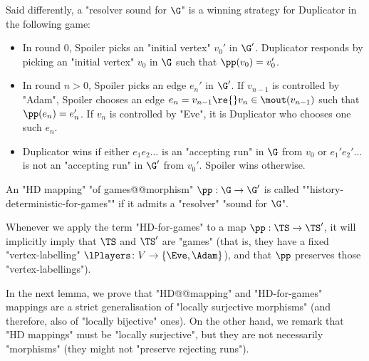 \documentclass{theoretics}
\begin{document}
Said differently, a "resolver sound for $\G$" is a winning strategy for Duplicator in the following game:
\begin{itemize}
	\item In round $0$, Spoiler picks an "initial vertex" $v_0'$ in $\G'$. Duplicator responds by picking an "initial vertex" $v_0$ in $\G$ such that $\pp(v_0) = v_0'$.
	\item In round $n>0$, Spoiler picks an edge $e_n'$ in $\G'$. If $v_{n-1}$ is controlled by "Adam", Spoiler chooses an edge $e_n = v_{n-1}\re{} v_{n}\in \mout(v_{n-1})$ such that $\pp(e_n) = e_n'$. If $v_n$ is controlled by "Eve", it is Duplicator who chooses one such $e_n$. 
	\item Duplicator wins if either $e_1e_2\dots$ is an "accepting run" in $\G $ from $v_0$ or $e_1'e_2'\dots$ is not an "accepting run" in $\G'$ from $v_0'$. Spoiler wins otherwise.
\end{itemize}

\begin{definition}\label{def:HD mapping-for-games}
	An "HD mapping" "of games@@morphism" $\pp:\G \to \G'$ is called ""history-deterministic-for-games"" if it admits a "resolver" "sound for $\G$".
\end{definition}

Whenever we apply the term "HD-for-games" to a map $\pp:\TS \to \TS'$, it will implicitly imply that $\TS$ and $\TS'$ are "games" (that is, they have a fixed "vertex-labelling" $\lPlayers\colon V\to \{\Eve, \Adam\}$), and that $\pp$ preserves those "vertex-labellings").



In the next lemma, we prove that "HD@@mapping" and "HD-for-games" mappings are a strict generalisation of "locally surjective morphisms" (and therefore, also of "locally bijective" ones). On the other hand, we remark that "HD mappings" must be "locally surjective", but they are not necessarily "morphisms" (they might not "preserve rejecting runs").
\end{document}
